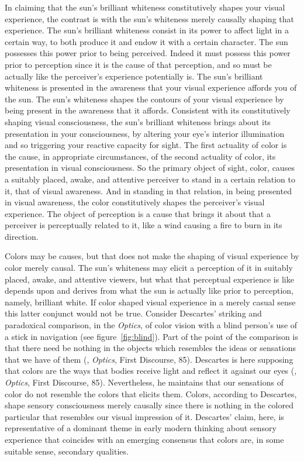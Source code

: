 In claiming that the sun's brilliant whiteness constitutively shapes your visual experience, the contrast is with the sun's whiteness merely causally shaping that experience. The sun's brilliant whiteness consist in its power to affect light in a certain way, to both produce it and endow it with a certain character. The sun possesses this power prior to being perceived. Indeed it must possess this power prior to perception since it is the cause of that perception, and so must be actually like the perceiver's experience potentially is. The sun's brilliant whiteness is presented in the awareness that your visual experience affords you of the sun. The sun's whiteness shapes the contours of your visual experience by being present in the awareness that it affords. Consistent with its constitutively shaping visual consciousness, the sun's brilliant whiteness brings about its presentation in your consciousness, by altering your eye's interior illumination and so triggering your reactive capacity for sight. The first actuality of color is the cause, in appropriate circumstances, of the second actuality of color, its presentation in visual consciousness. So the primary object of sight, color, causes a suitably placed, awake, and attentive perceiver to stand in a certain relation to it, that of visual awareness. And in standing in that relation, in being presented in visual awareness, the color constitutively shapes the perceiver's visual experience. The object of perception is a cause that brings it about that a perceiver is perceptually related to it, like a wind causing a fire to burn in its direction.

Colors may be causes, but that does not make the shaping of visual experience by color merely causal. The sun's whiteness may elicit a perception of it in suitably placed, awake, and attentive viewers, but what that perceptual experience is like depends upon and derives from what the sun is actually like prior to perception, namely, brilliant white. If color shaped visual experience in a merely casual sense this latter conjunct would not be true. Consider Descartes' \citeyearpar{Descartes:1637uq} striking and paradoxical comparison, in the \emph{Optics}, of color vision with a blind person's use of a stick in navigation (see figure~\ref{fig:blind}). Part of the point of the comparison is that there need be nothing in the objects which resembles the ideas or sensations that we have of them (\citealt{Descartes:1637uq}, \emph{Optics}, First Discourse, 85). Descartes is here supposing that colors are the ways that bodies receive light and reflect it against our eyes (\citealt{Descartes:1637uq}, \emph{Optics}, First Discourse, 85). Nevertheless, he maintains that our sensations of color do not resemble the colors that elicits them. Colors, according to Descartes, shape sensory consciousness merely causally since there is nothing in the colored particular that resembles our visual impression of it. Descartes' claim, here, is representative of a dominant theme in early modern thinking about sensory experience that coincides with an emerging consensus that colors are, in some suitable sense, secondary qualities.

